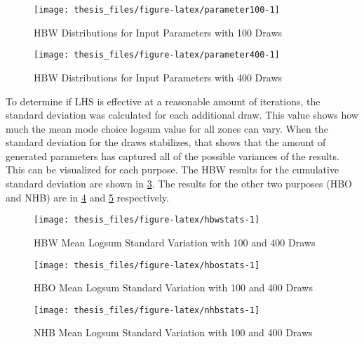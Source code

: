 \documentclass[fancy, masters,twoside]{byuthesis}
\begin{document}
\begin{figure}

{\centering \texttt{[image: thesis\_files/figure-latex/parameter100-1]} 

}

\caption{HBW Distributions for Input Parameters with 100 Draws}\label{fig:parameter100}
\end{figure}

\begin{figure}

{\centering \texttt{[image: thesis\_files/figure-latex/parameter400-1]} 

}

\caption{HBW Distributions for Input Parameters with 400 Draws}\label{fig:parameter400}
\end{figure}

To determine if LHS is effective at a reasonable amount of iterations, the standard deviation was calculated for each additional draw. This value shows how much the mean mode choice logsum value for all zones can vary. When the standard deviation for the draws stabilizes, that shows that the amount of generated parameters has captured all of the possible variances of the results. This can be visualized for each purpose. The HBW results for the cumulative standard deviation are shown in \ref{fig:hbwstats}. The results for the other two purposes (HBO and NHB) are in \ref{fig:hbostats} and \ref{fig:nhbstats} respectively.

\begin{figure}

{\centering \texttt{[image: thesis\_files/figure-latex/hbwstats-1]} 

}

\caption{HBW Mean Logsum Standard Variation with 100 and 400 Draws}\label{fig:hbwstats}
\end{figure}

\begin{figure}

{\centering \texttt{[image: thesis\_files/figure-latex/hbostats-1]} 

}

\caption{HBO Mean Logsum Standard Variation with 100 and 400 Draws}\label{fig:hbostats}
\end{figure}

\begin{figure}

{\centering \texttt{[image: thesis\_files/figure-latex/nhbstats-1]} 

}

\caption{NHB Mean Logsum Standard Variation with 100 and 400 Draws}\label{fig:nhbstats}
\end{figure}
\end{document}
